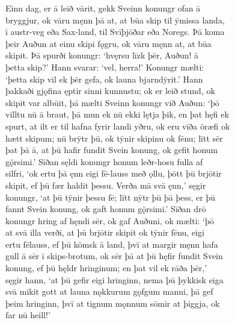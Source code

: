 \documentclass[12pt,letterpaper]{book}
\begin{document}
\begin{linenumbers}
Einn dag, er ā leið vārit, gekk Sveinn konungr ofan ā\\
bryggjur, ok vāru męnn þā at, at būa skip til ȳmissa landa,\\
ī austr-veg eða Sax-land, til Svīþjōðar eða Noregs.  Þā koma\\
þeir Auðun at einu skipi fǫgru, ok vāru męnn at, at būa\\
skipit.  Þā spurði konungr: `hvęrsu līzk þēr, Auðun! ā\\
þetta skip?'  Hann svarar: `vel, herra!'  Konungr mælti:\\
`þetta skip vil ek þēr gefa, ok launa bjarndȳrit.'  Hann\\
þakkaði gjǫfina ęptir sinni kunnustu; ok er leið stund, ok\\
skipit var albūit, þā mælti Sveinn konungr við Auðun: `þō\\
villtu nū ā braut, þā mun ek nū ekki lętja þik, en þat hęfi ek\\
spurt, at ilt er til hafna fyrir landi yðru, ok eru vīða öræfi ok\\
hætt skipum; nū brȳtr þū, ok tȳnir skipinu ok fēnu; lītt sēr\\
þat þā ā, at þū hafir fundit Svein konung, ok gefit honum\\
gǫ̈rsimi.'  Sīðan sęldi konungr honum leðr-hosu fulla af\\
silfri, `ok ertu þā ęnn eigi fē-lauss með ǫllu, þōtt þū brjōtir\\
skipit, ef þū fær haldit þessu.  Verða mā svā ęnn,' sęgir\\
konungr, `at þū tȳnir þessu fē; lītt nȳtr þū þā þess, er þū\\
fannt Svein konung, ok gaft honum gǫ̈rsimi.'  Sīðan drō\\
konungr hring af hęndi sēr, ok gaf Auðuni, ok mælti: `þō\\
at svā illa verði, at þū brjōtir skipit ok tȳnir fēnu, eigi\\
ertu fēlauss, ef þū kömsk ā land, þvī at margir męnn hafa\\
gull ā sēr ī skips-brotum, ok sēr þā at þū hęfir fundit Svein\\
konung, ef þū hęldr hringinum; en þat vil ek rāða þēr,'\\
sęgir hann, `at þū gefir eigi hringinn, nema þū þykkisk eiga\\
svā mikit gott at launa nǫkkurum gǫfgum manni, þā gef\\
þeim hringinn, þvī at tignum mǫnnum sōmir at þiggja, ok\\
far nū heill!'


\end{linenumbers}
\end{document}
